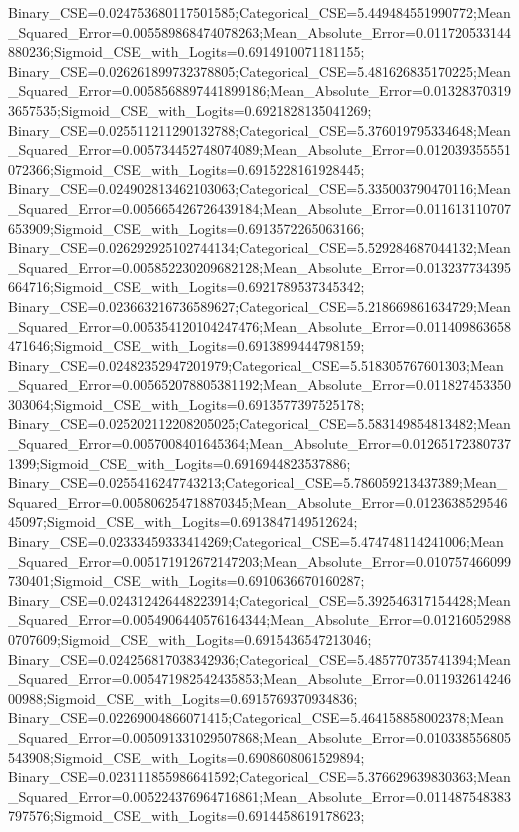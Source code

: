 Binary_CSE=0.024753680117501585;Categorical_CSE=5.449484551990772;Mean_Squared_Error=0.005589868474078263;Mean_Absolute_Error=0.011720533144880236;Sigmoid_CSE_with_Logits=0.6914910071181155;
Binary_CSE=0.026261899732378805;Categorical_CSE=5.481626835170225;Mean_Squared_Error=0.0058568897441899186;Mean_Absolute_Error=0.013283703193657535;Sigmoid_CSE_with_Logits=0.6921828135041269;
Binary_CSE=0.025511211290132788;Categorical_CSE=5.376019795334648;Mean_Squared_Error=0.005734452748074089;Mean_Absolute_Error=0.012039355551072366;Sigmoid_CSE_with_Logits=0.6915228161928445;
Binary_CSE=0.024902813462103063;Categorical_CSE=5.335003790470116;Mean_Squared_Error=0.005665426726439184;Mean_Absolute_Error=0.011613110707653909;Sigmoid_CSE_with_Logits=0.6913572265063166;
Binary_CSE=0.026292925102744134;Categorical_CSE=5.529284687044132;Mean_Squared_Error=0.005852230209682128;Mean_Absolute_Error=0.013237734395664716;Sigmoid_CSE_with_Logits=0.6921789537345342;
Binary_CSE=0.023663216736589627;Categorical_CSE=5.218669861634729;Mean_Squared_Error=0.005354120104247476;Mean_Absolute_Error=0.011409863658471646;Sigmoid_CSE_with_Logits=0.6913899444798159;
Binary_CSE=0.02482352947201979;Categorical_CSE=5.518305767601303;Mean_Squared_Error=0.005652078805381192;Mean_Absolute_Error=0.011827453350303064;Sigmoid_CSE_with_Logits=0.6913577397525178;
Binary_CSE=0.025202112208205025;Categorical_CSE=5.583149854813482;Mean_Squared_Error=0.0057008401645364;Mean_Absolute_Error=0.012651723807371399;Sigmoid_CSE_with_Logits=0.6916944823537886;
Binary_CSE=0.0255416247743213;Categorical_CSE=5.786059213437389;Mean_Squared_Error=0.005806254718870345;Mean_Absolute_Error=0.012363852954645097;Sigmoid_CSE_with_Logits=0.6913847149512624;
Binary_CSE=0.02333459333414269;Categorical_CSE=5.474748114241006;Mean_Squared_Error=0.005171912672147203;Mean_Absolute_Error=0.010757466099730401;Sigmoid_CSE_with_Logits=0.6910636670160287;
Binary_CSE=0.024312426448223914;Categorical_CSE=5.392546317154428;Mean_Squared_Error=0.0054906440576164344;Mean_Absolute_Error=0.012160529880707609;Sigmoid_CSE_with_Logits=0.6915436547213046;
Binary_CSE=0.024256817038342936;Categorical_CSE=5.485770735741394;Mean_Squared_Error=0.005471982542435853;Mean_Absolute_Error=0.01193261424600988;Sigmoid_CSE_with_Logits=0.6915769370934836;
Binary_CSE=0.02269004866071415;Categorical_CSE=5.464158858002378;Mean_Squared_Error=0.005091331029507868;Mean_Absolute_Error=0.010338556805543908;Sigmoid_CSE_with_Logits=0.6908608061529894;
Binary_CSE=0.023111855986641592;Categorical_CSE=5.376629639830363;Mean_Squared_Error=0.005224376964716861;Mean_Absolute_Error=0.011487548383797576;Sigmoid_CSE_with_Logits=0.6914458619178623;
